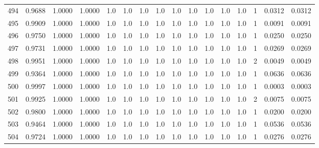 \begin{tabular}{lrrrrrrrrrrrrrrr}
494 &      0.9688 &  1.0000 &  1.0000 &     1.0 &     1.0 &     1.0 &     1.0 &     1.0 &     1.0 &     1.0 &      1.0 &        1.0 &      1 &                    0.0312 &                     0.0312 \\
495 &      0.9909 &  1.0000 &  1.0000 &     1.0 &     1.0 &     1.0 &     1.0 &     1.0 &     1.0 &     1.0 &      1.0 &        1.0 &      1 &                    0.0091 &                     0.0091 \\
496 &      0.9750 &  1.0000 &  1.0000 &     1.0 &     1.0 &     1.0 &     1.0 &     1.0 &     1.0 &     1.0 &      1.0 &        1.0 &      1 &                    0.0250 &                     0.0250 \\
497 &      0.9731 &  1.0000 &  1.0000 &     1.0 &     1.0 &     1.0 &     1.0 &     1.0 &     1.0 &     1.0 &      1.0 &        1.0 &      1 &                    0.0269 &                     0.0269 \\
498 &      0.9951 &  1.0000 &  1.0000 &     1.0 &     1.0 &     1.0 &     1.0 &     1.0 &     1.0 &     1.0 &      1.0 &        1.0 &      2 &                    0.0049 &                     0.0049 \\
499 &      0.9364 &  1.0000 &  1.0000 &     1.0 &     1.0 &     1.0 &     1.0 &     1.0 &     1.0 &     1.0 &      1.0 &        1.0 &      1 &                    0.0636 &                     0.0636 \\
500 &      0.9997 &  1.0000 &  1.0000 &     1.0 &     1.0 &     1.0 &     1.0 &     1.0 &     1.0 &     1.0 &      1.0 &        1.0 &      1 &                    0.0003 &                     0.0003 \\
501 &      0.9925 &  1.0000 &  1.0000 &     1.0 &     1.0 &     1.0 &     1.0 &     1.0 &     1.0 &     1.0 &      1.0 &        1.0 &      2 &                    0.0075 &                     0.0075 \\
502 &      0.9800 &  1.0000 &  1.0000 &     1.0 &     1.0 &     1.0 &     1.0 &     1.0 &     1.0 &     1.0 &      1.0 &        1.0 &      1 &                    0.0200 &                     0.0200 \\
503 &      0.9464 &  1.0000 &  1.0000 &     1.0 &     1.0 &     1.0 &     1.0 &     1.0 &     1.0 &     1.0 &      1.0 &        1.0 &      1 &                    0.0536 &                     0.0536 \\
504 &      0.9724 &  1.0000 &  1.0000 &     1.0 &     1.0 &     1.0 &     1.0 &     1.0 &     1.0 &     1.0 &      1.0 &        1.0 &      1 &                    0.0276 &                     0.0276 \\

\end{tabular}
